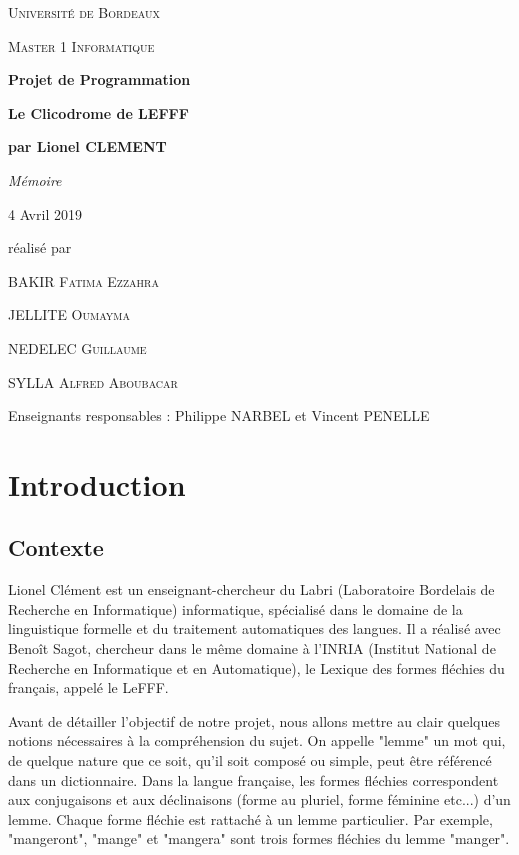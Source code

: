 \documentclass[12pt,a4paper]{article}
\begin{document}
\begin{titlepage}
\centering
{\scshape\LARGE Université de Bordeaux \par}
{\scshape\Large Master 1 Informatique  \par}
\vspace{3cm}

{\Huge\bfseries Projet de Programmation\par}
{\Huge\bfseries Le Clicodrome de LEFFF \par}
{\Large\bfseries par Lionel CLEMENT \par}
\vspace{0.5cm}
{\Large\itshape Mémoire \par}
{\large 4 Avril 2019\par}

\vfill
réalisé par \par
BAKIR \textsc{Fatima Ezzahra} \par
JELLITE \textsc{Oumayma} \par
NEDELEC \textsc{Guillaume} \par
SYLLA  \textsc{Alfred Aboubacar} \par
\vfill

{\large Enseignants responsables : Philippe NARBEL et Vincent PENELLE\par}

\end{titlepage}

\newpage
\tableofcontents
\newpage
\listoffigures

\newpage

\section{Introduction}

\subsection{Contexte}

\smallbreak Lionel Clément est un enseignant-chercheur du Labri (Laboratoire Bordelais de Recherche en Informatique) informatique, spécialisé dans le domaine de la linguistique formelle et du traitement automatiques des langues. Il a réalisé avec Benoît Sagot, chercheur dans le même domaine à l'INRIA (Institut National de Recherche en Informatique et en Automatique), le Lexique des formes fléchies du français, appelé le LeFFF.

Avant de détailler l’objectif de notre projet, nous allons mettre
au clair quelques notions nécessaires à la compréhension du sujet. 
On appelle "lemme" un mot qui, de quelque nature que ce soit, qu'il soit composé ou simple, peut être référencé dans un dictionnaire.
Dans la langue française, les formes fléchies correspondent aux conjugaisons et aux déclinaisons (forme au pluriel, forme féminine etc...) d'un lemme. Chaque forme fléchie est rattaché à un lemme particulier.
Par exemple, "mangeront", "mange" et "mangera" sont trois formes fléchies du lemme "manger".
\end{document}

